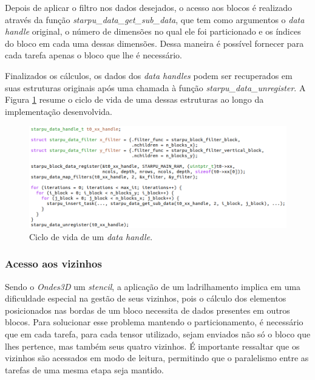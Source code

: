 \documentclass[cic,tc]{iiufrgs}
\begin{document}
Depois de aplicar o filtro nos dados desejados, o acesso aos blocos é realizado através da função \textit{starpu\_data\_get\_sub\_data},
que tem como argumentos o \textit{data handle} original, o número de dimensões no qual ele foi particionado e os índices do bloco em cada
uma dessas dimensões. Dessa maneira é possível fornecer para cada tarefa apenas o bloco que lhe é necessário.

Finalizados os cálculos, os dados dos \textit{data handles} podem ser recuperados em suas estruturas originais após
uma chamada à função \textit{starpu\_data\_unregister}. A Figura \ref{fig:data_cycle} resume o ciclo de vida de uma dessas estruturas ao
longo da implementação desenvolvida.

\begin{figure}[!htb]
  \caption{Ciclo de vida de um \textit{data handle}.}
    \begin{center} 
      \includegraphics[width=35em]{data_cycle}
    \end{center}
    \label{fig:data_cycle}
\end{figure}

\subsubsection{Acesso aos vizinhos}\label{sec:neighborhood}

Sendo o \textit{Ondes3D} um \textit{stencil}, a aplicação de um ladrilhamento implica em uma dificuldade especial na gestão de seus
vizinhos, pois o cálculo dos elementos posicionados nas bordas de um bloco necessita de dados presentes em outros blocos. Para solucionar
esse problema mantendo o particionamento, é necessário que em cada tarefa, para cada tensor utilizado, sejam enviados não só o bloco
que lhes pertence, mas também seus quatro vizinhos. É importante ressaltar que os vizinhos são acessados em modo de leitura, permitindo
que o paralelismo entre as tarefas de uma mesma etapa seja mantido.
\end{document}
